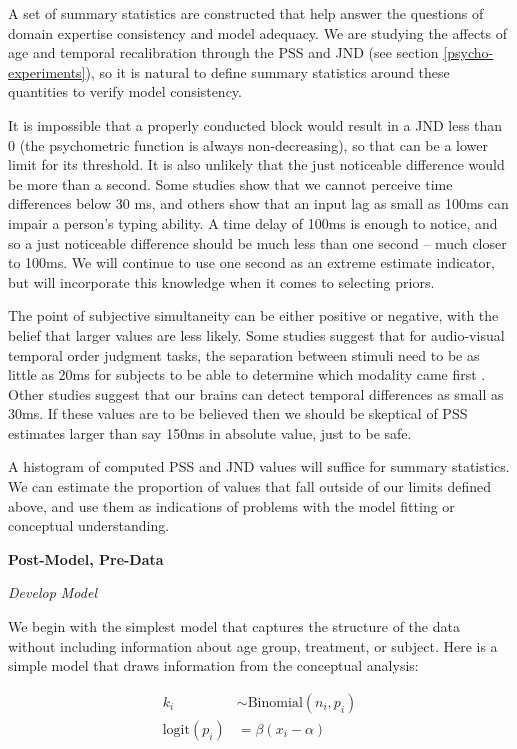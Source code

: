 \documentclass[11pt, oneside, openany]{scrbook}
\begin{document}
A set of summary statistics are constructed that help answer the questions of domain expertise consistency and model adequacy. We are studying the affects of age and temporal recalibration through the PSS and JND (see section \ref{psycho-experiments}), so it is natural to define summary statistics around these quantities to verify model consistency.

It is impossible that a properly conducted block would result in a JND less than 0 (the psychometric function is always non-decreasing), so that can be a lower limit for its threshold. It is also unlikely that the just noticeable difference would be more than a second. Some studies show that we cannot perceive time differences below 30 ms, and others show that an input lag as small as 100ms can impair a person's typing ability. A time delay of 100ms is enough to notice, and so a just noticeable difference should be much less than one second -- much closer to 100ms. We will continue to use one second as an extreme estimate indicator, but will incorporate this knowledge when it comes to selecting priors.

The point of subjective simultaneity can be either positive or negative, with the belief that larger values are less likely. Some studies suggest that for audio-visual temporal order judgment tasks, the separation between stimuli need to be as little as 20ms for subjects to be able to determine which modality came first \citep{vatakis2007influence}. Other studies suggest that our brains can detect temporal differences as small as 30ms. If these values are to be believed then we should be skeptical of PSS estimates larger than say 150ms in absolute value, just to be safe.

A histogram of computed PSS and JND values will suffice for summary statistics. We can estimate the proportion of values that fall outside of our limits defined above, and use them as indications of problems with the model fitting or conceptual understanding.

\textbf{Post-Model, Pre-Data}

\emph{Develop Model}

We begin with the simplest model that captures the structure of the data without including information about age group, treatment, or subject. Here is a simple model that draws information from the conceptual analysis:


\begin{align*}
  k_i &\sim \mathrm{Binomial}(n_i, p_i) \\
  \mathrm{logit}(p_i) &= \beta ( x_i - \alpha )
\end{align*}
\end{document}
